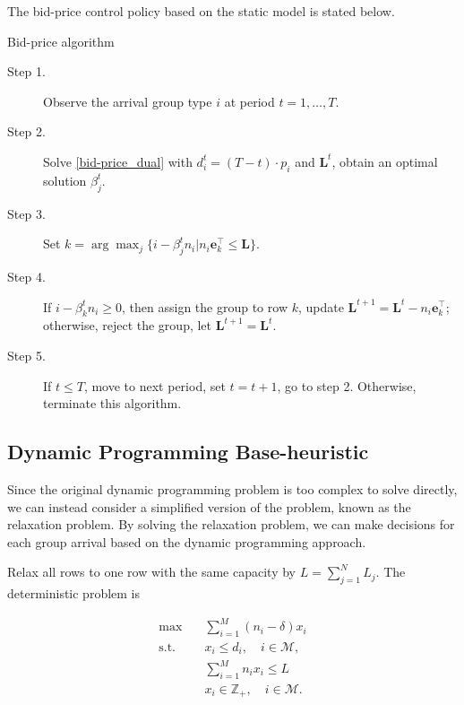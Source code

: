The bid-price control policy based on the static model is stated below.

\begin{algorithm}[H]
  \caption{Bid-price algorithm}
  \begin{description}
    \item[Step 1.] Observe the arrival group type $i$ at period $t = 1, \ldots, T$.
    \item[Step 2.] Solve \eqref{bid-price_dual} with $d_i^{t} = (T-t) \cdot p_i$ and $\mathbf{L}^{t}$, obtain an optimal solution $\beta_{j}^{t}$.
    \item[Step 3.] Set $k = \arg \max_{j} \{i -\beta_{j}^{t} n_i | n_i \mathbf{e}_{k}^{\top} \leq \mathbf{L}\}$.
    \item[Step 4.] If $i -\beta_{k}^{t} n_i \geq 0$, then assign the group to row $k$, update $\mathbf{L}^{t+1} = \mathbf{L}^{t} - n_i \mathbf{e}_{k}^{\top}$; otherwise, reject the group, let $\mathbf{L}^{t+1} = \mathbf{L}^{t}$. 
    \item[Step 5.] If $t \leq T$, move to next period, set $t = t+1$, go to step 2. Otherwise, terminate this algorithm.
  \end{description}
\end{algorithm}


\subsection{Dynamic Programming Base-heuristic}
Since the original dynamic programming problem is too complex to solve directly, we can instead consider a simplified version of the problem, known as the relaxation problem. By solving the relaxation problem, we can make decisions for each group arrival based on the dynamic programming approach.

Relax all rows to one row with the same capacity by $L = \sum_{j=1}^{N} L_j$. The deterministic problem is

\begin{equation}\label{relax_deter}
  \begin{aligned}
  \max \quad & \sum_{i=1}^{M} (n_i- \delta) x_{i} \\
  \text {s.t.} \quad & x_{i} \leq d_{i}, \quad i \in \mathcal{M}, \\
  & \sum_{i=1}^{M} n_{i} x_{i} \leq L \\
  & x_{i} \in \mathbb{Z}_{+}, \quad i \in \mathcal{M}.
  \end{aligned}
\end{equation}

